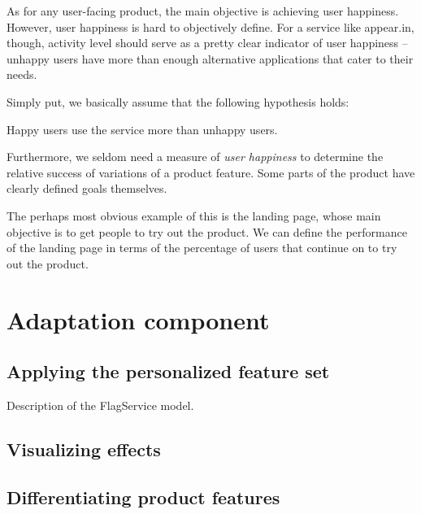 As for any user-facing product, the main objective is achieving user happiness. However, user happiness is hard to objectively define. For a service like appear.in, though, activity level should serve as a pretty clear indicator of user happiness -- unhappy users have more than enough alternative applications that cater to their needs.

Simply put, we basically assume that the following hypothesis holds:

\begin{hypothesis}
  Happy users use the service more than unhappy users.
\end{hypothesis}

Furthermore, we seldom need a measure of \emph{user happiness} to determine the relative success of variations of a product feature. Some parts of the product have clearly defined goals themselves.

The perhaps most obvious example of this is the landing page, whose main objective is to get people to try out the product. We can define the performance of the landing page in terms of the percentage of users that continue on to try out the product.

\section{Adaptation component} %
\label{approach:sec:adaptation_component}


\subsection{Applying the personalized feature set} %
\label{approach:sec:applying_the_personalized_feature_set}

Description of the FlagService model.


\subsection{Visualizing effects} %
\label{approach:sec:visualizing_effects}



\subsection{Differentiating product features} %
\label{approach:sec:differentiating_product_features}

